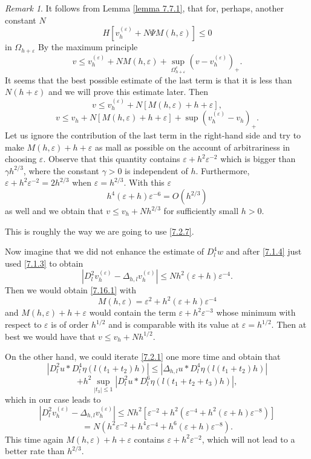 \documentclass[11pt, reqno]{amsart}
\theoremstyle{definition}
\theoremstyle{remark}
\newtheorem{remark}{Remark}[section]
\begin{document}
\begin{remark}
It follows from Lemma \ref{lemma 7.7.1}, that
for, perhaps, another constant $N$
$$
H[v _{h}^{ (\varepsilon)}+N \Psi M(h,\varepsilon)]\leq 0
$$
in $\Omega_{h+\varepsilon}$
By the maximum principle
\begin{equation}
                                                  \label{7.17.1}
v\leq v _{h}^{ (\varepsilon)}+N M(h,\varepsilon)
+\sup_{\Omega_{h+\varepsilon}^{c}}(v-v _{h}^{ (\varepsilon)})_{+}.
\end{equation}
It seems that the best possible estimate of the last term is that
it is less than $N(h+\varepsilon)$ and we will prove this estimate
later. Then
$$
v\leq v _{h}^{ (\varepsilon)}+N [M(h,\varepsilon)+h+\varepsilon],
$$
\begin{equation}
                                                           \label{7.16.1}
v\leq v_{h}+N [M(h,\varepsilon)+h+\varepsilon]
+\sup(v _{h}^{ (\varepsilon)}
-v_{h})_{+}.
\end{equation}
Let us ignore the contribution of the last term in the right-hand side
and try to make $M(h,\varepsilon)+h+\varepsilon$ as mall as
possible on the  account of arbitrariness in choosing
$\varepsilon$. Observe that this quantity contains
$\varepsilon+h^{2}\varepsilon^{-2}$ which is bigger than $\gamma
h^{2/3}$, where the constant $\gamma>0$ is independent of $h$.
Furthermore, $\varepsilon+h^{2}\varepsilon^{-2}=2h^{2/3}$
when $\varepsilon=h^{2/3}$. With this $\varepsilon$
$$
h^{4}(\varepsilon+h)
\varepsilon^{-6}=O(h^{2/3})
$$
as well and we obtain that $v\leq v_{h}+Nh^{2/3}$ for sufficiently
small $h>0$.

This is roughly the way we are going to use \eqref{7.2.7}.

Now imagine that we did not enhance the estimate
of $D^{4}_{l}w$ and  after \eqref{7.1.4}
just used \eqref{7.1.3} to obtain
$$
|D_{l}^{2}v _{h}^{ (\varepsilon)}-\Delta_{h,l}v _{h}^{ (\varepsilon)}|
\leq  Nh^{2}(\varepsilon+h)\varepsilon^{-4}.
$$
Then we would obtain \eqref{7.16.1} with
$$
M(h,\varepsilon)=\varepsilon^{2}+h^{2}(\varepsilon+h)
\varepsilon^{-4}$$
and $M(h,\varepsilon)+h+\varepsilon$ would contain the term
$\varepsilon+h^{2}\varepsilon^{-3}$ whose minimum with respect
to $\varepsilon$ is of order $h^{1/2}$
and is comparable with its value at $\varepsilon=h^{1/2}$.
Then at best we would have that $v\leq v_{h}+Nh^{1/2}$.

On the other hand, we could iterate \eqref{7.2.1} one more time
and obtain that
$$
|D_{l}^{2} u*D_{l}^{4}\eta (l(t_{1}+t_{2})h)|\leq
|\Delta_{h,l} u*D_{l}^{4}\eta (l(t_{1}+t_{2})h)|
$$
$$
+h^{2}\sup_{|t_{3}|\leq1}|D_{l}^{2} u*D_{l}^{6}\eta (l(t_{1}+t_{2}+t_{3})h)|,
$$
which in our case  leads to
$$
|D_{l}^{2}v _{h}^{ (\varepsilon)}-\Delta_{h,l}v _{h}^{ (\varepsilon)}|
\leq Nh^{2}[\varepsilon^{-2}+h^{2}(\varepsilon^{-4}+
h^{2}(\varepsilon+h)\varepsilon^{-8})]
$$
$$
=N(h^{2}\varepsilon^{-2}+h^{4}\varepsilon^{-4}+h^{6}
(\varepsilon+h)\varepsilon^{-8}).
$$
This time again $M(h,\varepsilon)+h+\varepsilon $  contains 
$\varepsilon +h^{2}\varepsilon^{-2}$, which
  will not lead to a better rate than $h^{2/3}$.


\end{remark}
\end{document}
